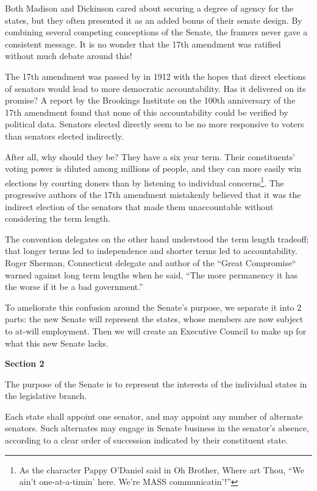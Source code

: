 \documentclass{article}
\newcommand{\quotes}[1]{``#1''}
\begin{document}
Both Madison and Dickinson cared about securing a degree of agency for the states, but they often presented it as an added bonus of their senate design. By combining several competing conceptions of the Senate, the framers never gave a consistent message. It is no wonder that the 17th amendment was ratified without much debate around this!

The 17th amendment was passed by in 1912 with the hopes that direct elections of senators would lead to more democratic accountability\cite{Eisinger}. Has it delivered on its promise? A report by the Brookings Institute on the 100th anniversary of the 17th amendment found that none of this accountability could be verified by political data\cite{Schiller}. Senators elected directly seem to be no more responsive to voters than senators elected indirectly.

After all, why should they be? They have a six year term. Their constituents' voting power is diluted among millions of people, and they can more easily win elections by courting doners than by listening to individual concerns\footnote{As the character Pappy O'Daniel said in Oh Brother, Where art Thou, \quotes{We ain't one-at-a-timin' here. We're MASS communicatin'!}}. The progressive authors of the 17th amendment mistakenly believed that it was the indirect election of the senators that made them unaccountable without considering the term length.

The convention delegates on the other hand understood the term length tradeoff; that longer terms led to independence and shorter terms led to accountability. Roger Sherman, Connecticut delegate and author of the “Great Compromise“ warned against long term lengths when he said, \quotes{The more permanency it has the worse if it be a bad government.}\cite{Madison}

To ameliorate this confusion around the Senate's purpose, we separate it into 2 parts: the new Senate will represent the states, whose members are now subject to at-will employment.  Then we will create an Executive Council to make up for what this new Senate lacks.

\begin{quoting}
\textbf{Section 2}

The purpose of the Senate is to represent the interests of the individual states in the legislative branch.

Each state shall appoint one senator, and may appoint any number of alternate senators. Such alternates may engage in Senate business in the senator’s absence, according to a clear order of succession indicated by their constituent state.
\end{quoting}
\end{document}
